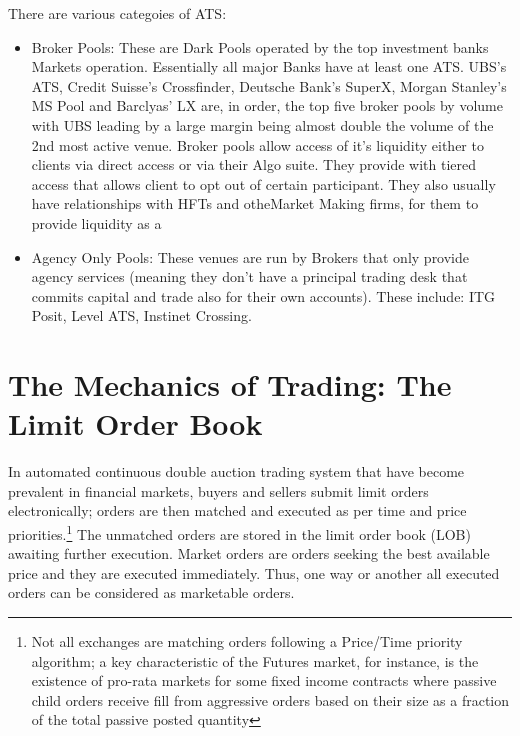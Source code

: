 There are various categoies of ATS:
\begin{itemize}
\item Broker Pools: These are Dark Pools operated by the top investment banks Markets operation. Essentially all major Banks have at least one ATS. UBS's ATS, Credit Suisse's Crossfinder, Deutsche Bank's SuperX, Morgan Stanley's MS Pool and Barclyas' LX are, in order,  the top five broker pools by volume with UBS leading by a large margin being almost double the volume of the 2nd most active venue. Broker pools allow access of it's liquidity either to clients via direct access or via their Algo suite. They provide with tiered access that allows client to opt out of certain participant. They also usually have relationships with HFTs and otheMarket Making firms, for them to provide liquidity as a
\item Agency Only Pools: These venues are run by Brokers that only provide agency services (meaning they don't have a principal trading desk that commits capital and trade also for their own accounts). These include: ITG Posit, Level ATS, Instinet Crossing.
\end{itemize}


\section{The Mechanics of Trading: The Limit Order Book}

In automated continuous double auction trading system that have become prevalent in financial markets, buyers and sellers submit limit orders electronically; orders are then matched and executed as per time and price priorities.\footnote{Not all exchanges are matching orders following a Price/Time priority algorithm; a key characteristic of the Futures market, for instance, is the existence of pro-rata markets for some fixed income contracts where passive child orders receive fill from aggressive orders based on their size as a fraction of the total passive posted quantity} The unmatched orders are stored in the limit order book (LOB) awaiting further execution. Market orders are orders seeking the best available price and they are executed immediately. Thus, one way or another all executed orders can be considered as marketable orders.


